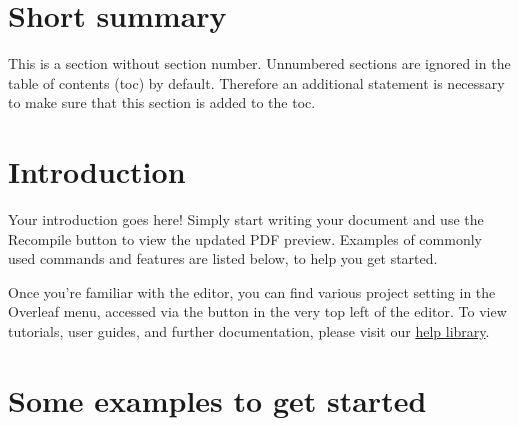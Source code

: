 \documentclass[12pt,a4paper,faculty=eb,language=en]{ugent-doc}
\begin{document}

\maketitle


{\hypersetup{hidelinks}\tableofcontents} %
\newpage


\section*{Short summary}

This is a section without section number. Unnumbered sections are ignored in the table of contents (toc) by default. Therefore an additional statement is necessary to make sure that this section is added to the toc.


\section{Introduction}

Your introduction goes here! Simply start writing your document and use the Recompile button to view the updated PDF preview. Examples of commonly used commands and features are listed below, to help you get started.

Once you're familiar with the editor, you can find various project setting in the Overleaf menu, accessed via the button in the very top left of the editor. To view tutorials, user guides, and further documentation, please visit our \href{https://www.overleaf.com/learn}{help library}.


\section{Some examples to get started}
\end{document}
